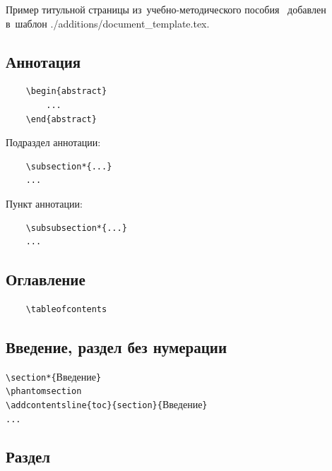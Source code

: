 \documentclass{SIBGU-state}
\begin{document}
Пример титульной страницы из~у\-чеб\-но-ме\-то\-ди\-чес\-ко\-го пособия~\cite{bib:recomendations} добавлен в~шаблон ./additions/document\_template.tex.


\subsection{Аннотация}

\begin{verbatim}
	\begin{abstract}
		...
	\end{abstract}
\end{verbatim}

Подраздел аннотации:
\begin{verbatim}
	\subsection*{...}
	...
\end{verbatim}

Пункт аннотации:
\begin{verbatim}
	\subsubsection*{...}
	...
\end{verbatim}

\subsection{Оглавление}

\begin{verbatim}
	\tableofcontents
\end{verbatim}


\subsection{Введение, раздел без нумерации}

\noindent\verb"\section*{"Введение\verb"}"\\
\verb"\phantomsection"\\
\verb"\addcontentsline{toc}{section}{"Введение\verb"}"\\
\verb"..."


\subsection{Раздел}
\end{document}

